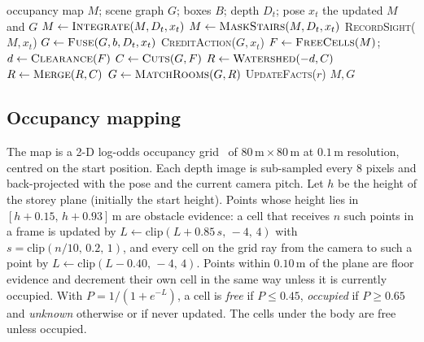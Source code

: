 \documentclass[10pt]{article}
\newcommand{\m}{\,\mathrm{m}}
\begin{document}
\begin{algorithm}[t]
\caption{\textsc{UpdateSceneGraph}: the map and the room graph after a new
frame. During the walk to a committed room the rooms are rebuilt only every
fifth action, when the set of confirmed doorways changes, and when the walk
ends.}
\label{alg:graph}
\small
\begin{algorithmic}[1]
\Require occupancy map $M$; scene graph $G$; boxes $B$; depth $D_t$; pose $x_t$
\Ensure the updated $M$ and $G$
\State $M \gets \textsc{Integrate}(M, D_t, x_t)$ \label{ln:graph-first}
\State $M \gets \textsc{MaskStairs}(M, D_t, x_t)$ 
\State \textsc{RecordSight}($M, x_t$) 
    \State $G \gets \textsc{Fuse}(G, b, D_t, x_t)$ 
\EndFor\label{ln:graph-last}
\State \textsc{CreditAction}($G, x_t$) 
 
    \State $F \gets \textsc{FreeCells}(M)$;\quad $d \gets \textsc{Clearance}(F)$ 
    \State $C \gets \textsc{Cuts}(G, F)$ 
    \State $R \gets \textsc{Watershed}(-d, C)$ 
    \State $R \gets \textsc{Merge}(R, C)$ \Comment{saddle dynamics below $0.2\m$; never across a cut}
    \State $G \gets \textsc{MatchRooms}(G, R)$ 
        \State \textsc{UpdateFacts}($r$) 
    \EndFor
\EndIf
\State \Return $M, G$
\end{algorithmic}
\end{algorithm}

\subsection{Occupancy mapping}\label{sec:mapping}
The map is a 2-D log-odds occupancy grid~\citep{elfes1989using} of
$80\m\times80\m$ at $0.1\m$ resolution, centred on the start position. Each
depth image is sub-sampled every $8$ pixels and back-projected with the pose
and the current camera pitch. Let $h$ be the height of the storey plane
(initially the start height). Points whose height lies in
$[h+0.15,\,h+0.93]\m$ are obstacle evidence: a cell that receives $n$ such
points in a frame is updated by
$L \leftarrow \mathrm{clip}(L + 0.85\,s,\,-4,\,4)$ with
$s=\mathrm{clip}(n/10,\,0.2,\,1)$, and every cell on the grid ray from the
camera to such a point by $L \leftarrow \mathrm{clip}(L-0.40,\,-4,\,4)$.
Points within $0.10\m$ of the plane are floor evidence and decrement their own
cell in the same way unless it is currently occupied. With
$P=1/(1+e^{-L})$, a cell is \emph{free} if $P\le0.45$, \emph{occupied} if
$P\ge0.65$ and \emph{unknown} otherwise or if never updated. The cells under
the body are free unless occupied.
\end{document}
